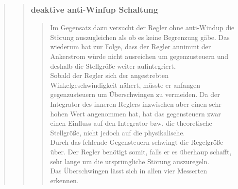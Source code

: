 \begin{quote}
\begin{quote}
\begin{quote}
		\end{quote}
		
		\subsubsection{deaktive anti-Winfup Schaltung}
		\begin{quote}
            Im Gegensatz dazu versucht der Regler ohne anti-Windup die Störung auszugleichen als ob es keine Begrenzung gäbe. Das
            wiederum hat zur Folge, dass der Regler annimmt der Ankerstrom würde nicht ausreichen um gegenzusteuern und
            deshalb die Stellgröße weiter aufintegriert.\\
            Sobald der Regler sich der angestrebten Winkelgeschwindigkeit nähert, müsste er anfangen gegenzusteuern um 
            Überschwingen zu vermeiden. Da der Integrator des inneren Reglers inzwischen aber einen sehr hohen Wert angenommen
            hat, hat das gegensteuern zwar einen Einfluss auf den Integrator bzw. die theoretische Stellgröße, nicht jedoch auf
            die physikalische.\\
            Durch das fehlende Gegensteuern schwingt die Regelgröße über. Der Regler benötigt somit, falls er es überhaup schafft,
            sehr lange um die ursprüngliche Störung auszuregeln.\\
            Das Überschwingen lässt sich in allen vier Messerten erkennen.
		\end{quote}
        
    \end{quote}


    
    
    
    
\end{quote}




%     
%         

